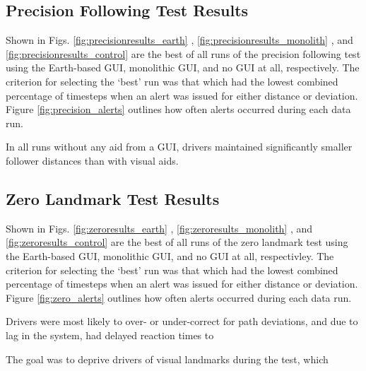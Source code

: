 \subsection{Precision Following Test Results} \label{sec:precisionfollowingresults}

Shown in Figs. \ref{fig:precisionresults_earth} , \ref{fig:precisionresults_monolith} , and \ref{fig:precisionresults_control} are the best of all runs of the precision following test using the Earth-based GUI, monolithic GUI, and no GUI at all, respectively. The criterion for selecting the `best' run was that which had the lowest combined percentage of timesteps when an alert was issued for either distance or deviation. Figure \ref{fig:precision_alerts} outlines how often alerts occurred during each data run.

In all runs without any aid from a GUI, drivers maintained significantly smaller follower distances than with visual aids. 


\subsection{Zero Landmark Test Results} \label{sec:zerolandmarkresults}

Shown in Figs. \ref{fig:zeroresults_earth} , \ref{fig:zeroresults_monolith} , and \ref{fig:zeroresults_control} are the best of all runs of the zero landmark test using the Earth-based GUI, monolithic GUI, and no GUI at all, respectivley. The criterion for selecting the `best' run was that which had the lowest combined percentage of timesteps when an alert was issued for either distance or deviation. Figure \ref{fig:zero_alerts} outlines how often alerts occurred during each data run.

Drivers were most likely to over- or under-correct for path deviations, and due to lag in the system, had delayed reaction times to 

The goal was to deprive drivers of visual landmarks during the test, which 

